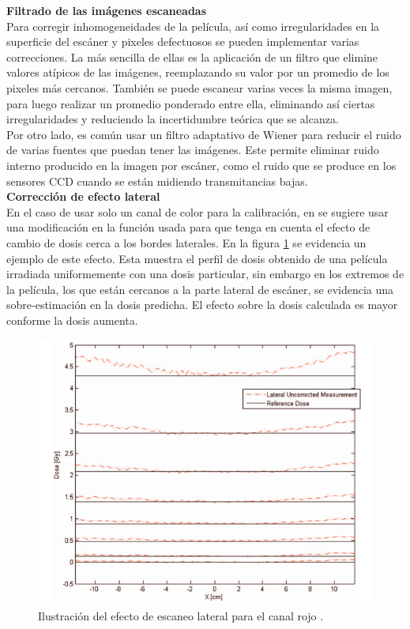 \textbf{Filtrado de las imágenes escaneadas\cite{Devic2005}\cite{Li2017}}\\

Para corregir inhomogeneidades de la película, así como irregularidades en la superficie del escáner y pixeles defectuosos se pueden implementar varias correcciones. La más sencilla de ellas es la aplicación de un filtro que elimine valores atípicos de las imágenes, reemplazando su valor por un promedio de los pixeles más cercanos. También se puede escanear varias veces la misma imagen, para luego realizar un promedio ponderado entre ella, eliminando así ciertas irregularidades y reduciendo la incertidumbre teórica que se alcanza.\\

Por otro lado, es común usar un filtro adaptativo de Wiener \cite{Benesty2008} para reducir el ruido de varias fuentes que puedan tener las imágenes. Este permite eliminar ruido interno producido en la imagen por escáner, como el ruido que se produce en los sensores CCD cuando se están midiendo transmitancias bajas.\\

\textbf{Corrección de efecto lateral} \\

En el caso de usar solo un canal de color para la calibración, en \cite{Crijns2013} se sugiere usar una modificación en la función usada para que tenga en cuenta el efecto de cambio de dosis cerca a los bordes laterales. En la figura \ref{fig:efectoLateral} se evidencia  un ejemplo de este efecto. Esta muestra el perfil de dosis obtenido de una película irradiada uniformemente con una dosis particular, sin embargo en los extremos de la película, los que están cercanos a la parte lateral de escáner, se evidencia una sobre-estimación en la dosis predicha. El efecto sobre la dosis calculada es mayor conforme la dosis aumenta.\\

\begin{figure}[H]
	\centering
	\includegraphics[width=0.8\linewidth]{images/efectoLateral.png}
	\caption{Ilustración del efecto de escaneo lateral para el canal rojo \cite{Crijns2013}.}
	\label{fig:efectoLateral}
\end{figure}

